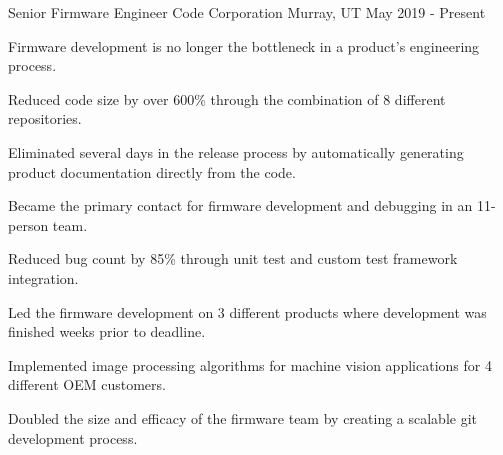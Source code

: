 


\begin{cventries}


\cventry
{Senior Firmware Engineer} %
{Code Corporation} %
{Murray, UT} %
{May 2019 - Present} %
{ %
\begin{cvitems}
\item Firmware development is no longer the bottleneck in a product's engineering process.
\item Reduced code size by over 600\% through the combination of 8 different repositories.
\item Eliminated several days in the release process by automatically generating product documentation directly from the code.
\item Became the primary contact for firmware development and debugging in an 11-person team.
\item Reduced bug count by 85\% through unit test and custom test framework integration.
\item Led the firmware development on 3 different products where development was finished weeks prior to deadline.
\item Implemented image processing algorithms for machine vision applications for 4 different OEM customers.
\item Doubled the size and efficacy of the firmware team by creating a scalable git development process.
\end{cvitems}
}



\end{cventries}
